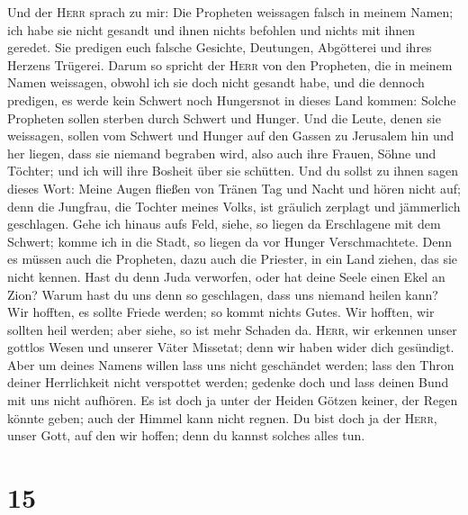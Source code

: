  Und der \textsc{Herr} sprach zu mir: Die Propheten
weissagen falsch in meinem Namen; ich habe sie nicht gesandt und ihnen
nichts befohlen und nichts mit ihnen geredet. Sie predigen euch falsche
Gesichte, Deutungen, Abgötterei und ihres Herzens Trügerei.
 Darum so spricht der \textsc{Herr} von den Propheten,
die in meinem Namen weissagen, obwohl ich sie doch nicht gesandt habe,
und die dennoch predigen, es werde kein Schwert noch Hungersnot in
dieses Land kommen: Solche Propheten sollen sterben durch Schwert und
Hunger.  Und die Leute, denen sie weissagen, sollen vom
Schwert und Hunger auf den Gassen zu Jerusalem hin und her liegen, dass
sie niemand begraben wird, also auch ihre Frauen, Söhne und Töchter; und
ich will ihre Bosheit über sie schütten.  Und du sollst
zu ihnen sagen dieses Wort: Meine Augen fließen von Tränen Tag und Nacht
und hören nicht auf; denn die Jungfrau, die Tochter meines Volks, ist
gräulich zerplagt und jämmerlich geschlagen.  Gehe ich
hinaus aufs Feld, siehe, so liegen da Erschlagene mit dem Schwert; komme
ich in die Stadt, so liegen da vor Hunger Verschmachtete. Denn es müssen
auch die Propheten, dazu auch die Priester, in ein Land ziehen, das sie
nicht kennen.  Hast du denn Juda verworfen, oder hat
deine Seele einen Ekel an Zion? Warum hast du uns denn so geschlagen,
dass uns niemand heilen kann? Wir hofften, es sollte Friede werden; so
kommt nichts Gutes. Wir hofften, wir sollten heil werden; aber siehe, so
ist mehr Schaden da.  \textsc{Herr}, wir erkennen unser
gottlos Wesen und unserer Väter Missetat; denn wir haben wider dich
gesündigt.  Aber um deines Namens willen lass uns nicht
geschändet werden; lass den Thron deiner Herrlichkeit nicht verspottet
werden; gedenke doch und lass deinen Bund mit uns nicht aufhören.
 Es ist doch ja unter der Heiden Götzen keiner, der Regen
könnte geben; auch der Himmel kann nicht regnen. Du bist doch ja der
\textsc{Herr}, unser Gott, auf den wir hoffen; denn du kannst solches
alles tun.

\hypertarget{section-14}{%
\section{15}\label{section-14}}

